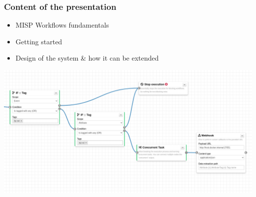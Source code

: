 
\begin{frame}[t,plain]
\titlepage
\end{frame}

\begin{frame}
    \frametitle{Content of the presentation}
    \begin{itemize}
        \item MISP Workflows fundamentals
        \item Getting started
        \item Design of the system \& how it can be extended
    \end{itemize}

    \begin{center}
        \includegraphics[width=0.9\linewidth]{pictures/overview.png}
    \end{center}
\end{frame}

